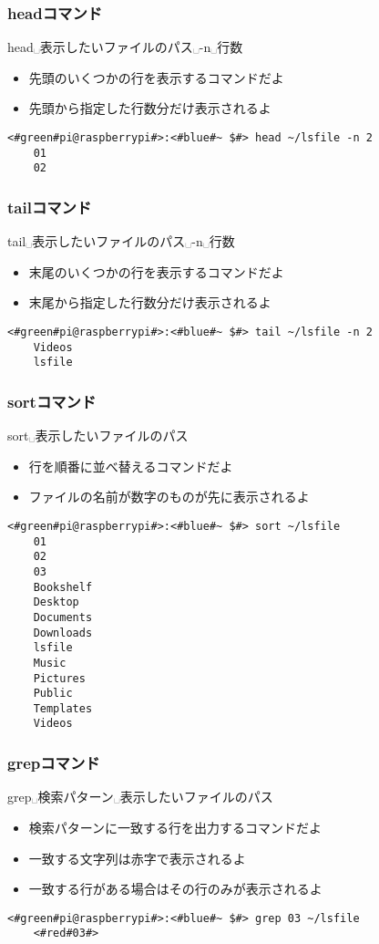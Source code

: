 \begin{frame}[fragile]
    \frametitle{headコマンド}
    head␣表示したいファイルのパス␣-n␣行数
    \begin{itemize}
        \item 先頭のいくつかの行を表示するコマンドだよ
        \item 先頭から指定した行数分だけ表示されるよ
    \end{itemize}
    \begin{lstlisting}[title=headコマンドの実行例, label=shuf_example]
    <#green#pi@raspberrypi#>:<#blue#~ $#> head ~/lsfile -n 2
    01
    02
    \end{lstlisting}
\end{frame}

\begin{frame}[fragile]
    \frametitle{tailコマンド}
    tail␣表示したいファイルのパス␣-n␣行数
    \begin{itemize}
        \item 末尾のいくつかの行を表示するコマンドだよ
        \item 末尾から指定した行数分だけ表示されるよ
    \end{itemize}
    \begin{lstlisting}[title=tailコマンドの実行例, label=shuf_example]
    <#green#pi@raspberrypi#>:<#blue#~ $#> tail ~/lsfile -n 2
    Videos
    lsfile
    \end{lstlisting}
\end{frame}

\begin{frame}[fragile]
    \frametitle{sortコマンド}
    sort␣表示したいファイルのパス
    \begin{itemize}
        \item 行を順番に並べ替えるコマンドだよ
        \item ファイルの名前が数字のものが先に表示されるよ
    \end{itemize}
    \begin{lstlisting}[title=sortコマンドの実行例, label=sort_example]
    <#green#pi@raspberrypi#>:<#blue#~ $#> sort ~/lsfile
    01
    02
    03
    Bookshelf
    Desktop
    Documents
    Downloads
    lsfile
    Music
    Pictures
    Public
    Templates
    Videos
    \end{lstlisting}
\end{frame}

\begin{frame}[fragile]
    \frametitle{grepコマンド}
    grep␣検索パターン␣表示したいファイルのパス
    \begin{itemize}
        \item 検索パターンに一致する行を出力するコマンドだよ
        \item 一致する文字列は赤字で表示されるよ
        \item 一致する行がある場合はその行のみが表示されるよ
    \end{itemize}
    \begin{lstlisting}[title=grepコマンドの実行例, label=grep_example]
    <#green#pi@raspberrypi#>:<#blue#~ $#> grep 03 ~/lsfile
    <#red#03#>
    \end{lstlisting}
\end{frame}

